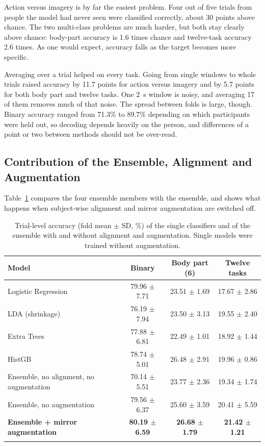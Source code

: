 \documentclass[pdflatex,sn-mathphys-num]{sn-jnl}%
\theoremstyle{thmstyleone}%
\theoremstyle{thmstyletwo}%
\theoremstyle{thmstylethree}%
\begin{document}
Action versus imagery is by far the easiest problem. Four out of five trials from people the model had never seen were classified correctly, about 30 points above chance. The two multi-class problems are much harder, but both stay clearly above chance: body-part accuracy is 1.6 times chance and twelve-task accuracy 2.6 times. As one would expect, accuracy falls as the target becomes more specific.

Averaging over a trial helped on every task. Going from single windows to whole trials raised accuracy by 11.7 points for action versus imagery and by 5.7 points for both body part and twelve tasks. One 2~s window is noisy, and averaging 17 of them removes much of that noise. The spread between folds is large, though. Binary accuracy ranged from 71.3\% to 89.7\% depending on which participants were held out, so decoding depends heavily on the person, and differences of a point or two between methods should not be over-read.

\subsection{Contribution of the Ensemble, Alignment and Augmentation}\label{subsec:ablation}

Table~\ref{tab:ablation} compares the four ensemble members with the ensemble, and shows what happens when subject-wise alignment and mirror augmentation are switched off.

\begin{table}[htbp]
\centering
\caption{Trial-level accuracy (fold mean $\pm$ SD, \%) of the single classifiers and of the ensemble with and without alignment and augmentation. Single models were trained without augmentation.}
\label{tab:ablation}
\footnotesize
\begin{tabular}{@{}lccc@{}}
\toprule
Model & Binary & Body part (6) & Twelve tasks \\
\midrule
Logistic Regression & 79.96 $\pm$ 7.71 & 23.51 $\pm$ 1.69 & 17.67 $\pm$ 2.86 \\
LDA (shrinkage) & 76.19 $\pm$ 7.94 & 23.50 $\pm$ 3.13 & 19.55 $\pm$ 2.40 \\
Extra Trees & 77.88 $\pm$ 6.81 & 22.49 $\pm$ 1.01 & 18.92 $\pm$ 1.44 \\
HistGB & 78.74 $\pm$ 5.01 & 26.48 $\pm$ 2.91 & 19.96 $\pm$ 0.86 \\
Ensemble, no alignment, no augmentation & 70.14 $\pm$ 5.51 & 23.77 $\pm$ 2.36 & 19.34 $\pm$ 1.74 \\
Ensemble, no augmentation & 79.56 $\pm$ 6.37 & 25.60 $\pm$ 3.59 & 20.41 $\pm$ 5.59 \\
\textbf{Ensemble + mirror augmentation} & \textbf{80.19 $\pm$ 6.59} & \textbf{26.68 $\pm$ 1.79} & \textbf{21.42 $\pm$ 1.21} \\
\botrule
\end{tabular}
\end{table}
\end{document}
